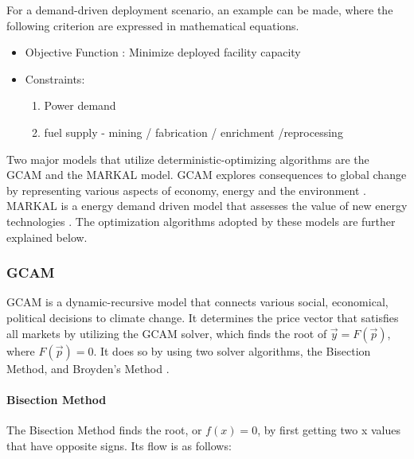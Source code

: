 For a demand-driven deployment scenario, an example can be made,
where the following criterion are expressed in mathematical equations.

\begin{itemize}
	\item[] Objective Function : Minimize deployed facility capacity
	\item[] Constraints:
	\begin{enumerate}
		\item Power demand
		\item fuel supply - mining / fabrication / enrichment /reprocessing
	\end{enumerate}
		
\end{itemize}



Two major models that utilize deterministic-optimizing algorithms are
the \gls{GCAM} and the \gls{MARKAL} model. \gls{GCAM} explores consequences to global
change by representing various aspects of economy, energy and the environment 
\cite{edmonds_advanced_1994}.
\gls{MARKAL} is a energy demand driven model that assesses the value of new
energy technologies \cite{fishbone_markal_1981}. The optimization algorithms adopted
by these models are further explained below.

\subsubsection{ \gls{GCAM}}
\gls{GCAM} is a dynamic-recursive model that connects various
social, economical, political decisions to climate change. 
It determines the price vector that satisfies all markets by
utilizing the GCAM solver, which finds the root of $\vec{y} = F(\vec{p})$,
where $F(\vec{p})=0$. It does so by using two solver algorithms, the Bisection Method,
and Broyden's Method \cite{patel_gcam_2016-1}. 

\paragraph{Bisection Method}
The Bisection Method finds the root, or $f(x)=0$, by first
getting two x values that have opposite signs. Its flow is as follows:

